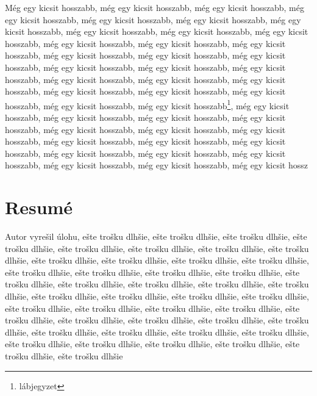 \documentclass[a4paper,oneside,onecolumn,12pt]{LegrandOrangeBook}
\begin{document}
Még egy kicsit hosszabb, még egy kicsit hosszabb, még egy kicsit hosszabb, még egy kicsit hosszabb, még egy kicsit hosszabb, még egy kicsit hosszabb, még egy kicsit hosszabb, még egy kicsit hosszabb, még egy kicsit hosszabb, még egy kicsit hosszabb, még egy kicsit hosszabb, még egy kicsit hosszabb, még egy kicsit hosszabb, még egy kicsit hosszabb, még egy kicsit hosszabb, még egy kicsit hosszabb, még egy kicsit hosszabb, még egy kicsit hosszabb, még egy kicsit hosszabb, még egy kicsit hosszabb, még egy kicsit hosszabb, még egy kicsit hosszabb, még egy kicsit hosszabb, még egy kicsit hosszabb, még egy kicsit hosszabb, még egy kicsit hosszabb, még egy kicsit hosszabb\footnote{lábjegyzet}, még egy kicsit hosszabb, még egy kicsit hosszabb, még egy kicsit hosszabb, még egy kicsit hosszabb, még egy kicsit hosszabb, még egy kicsit hosszabb, még egy kicsit hosszabb, még egy kicsit hosszabb, még egy kicsit hosszabb, még egy kicsit hosszabb, még egy kicsit hosszabb, még egy kicsit hosszabb, még egy kicsit hosszabb, még egy kicsit hosszabb, még egy kicsit hosszabb, még egy kicsit hossz


\pagebreak
{} %
\chapter*{Resumé}

Autor vyrešil úlohu, ešte trošku dlhšie, ešte trošku dlhšie, ešte trošku dlhšie, ešte trošku dlhšie, ešte trošku dlhšie, ešte trošku dlhšie, ešte trošku dlhšie, ešte trošku dlhšie, ešte trošku dlhšie, ešte trošku dlhšie, ešte trošku dlhšie, ešte trošku dlhšie, ešte trošku dlhšie, ešte trošku dlhšie, ešte trošku dlhšie, ešte trošku dlhšie, ešte trošku dlhšie, ešte trošku dlhšie, ešte trošku dlhšie, ešte trošku dlhšie, ešte trošku dlhšie, ešte trošku dlhšie, ešte trošku dlhšie, ešte trošku dlhšie, ešte trošku dlhšie, ešte trošku dlhšie, ešte trošku dlhšie, ešte trošku dlhšie, ešte trošku dlhšie, ešte trošku dlhšie, ešte trošku dlhšie, ešte trošku dlhšie, ešte trošku dlhšie, ešte trošku dlhšie, ešte trošku dlhšie, ešte trošku dlhšie, ešte trošku dlhšie, ešte trošku dlhšie, ešte trošku dlhšie, ešte trošku dlhšie, ešte trošku dlhšie, ešte trošku dlhšie, ešte trošku dlhšie, ešte trošku dlhšie

% 

\printbibliography[title=Hivatkozások] %
\pagebreak
\thispagestyle{empty}
\mbox{}
\vfill
\begin{Center}
\mbox{\vskip1cm}\EANisbn
\end{Center}
\end{document}
